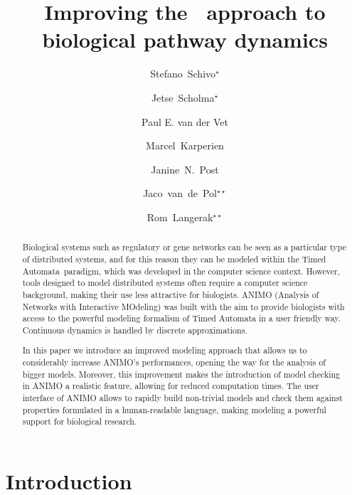 \documentclass{llncs}
\title{Improving the \tas\ approach to biological pathway dynamics}
\author{Stefano~Schivo${}^\star$
\and Jetse~Scholma${}^\star$
\and Paul E. van der Vet
\and Marcel~Karperien
\and Janine~N.~Post
\and Jaco~van~de~Pol${}^{\star \star}$
\and Rom~Langerak${}^{\star \star}$}
\institute{University of Twente, Enschede, The Netherlands}
\date{}
\newcommand{\tas}{Timed Automata}
\begin{document}
\maketitle

\let\oldthefootnote\thefootnote
\renewcommand{\thefootnote}{\fnsymbol{footnote}}
\let\thefootnote\oldthefootnote



\begin{abstract}

Biological systems such as regulatory or gene networks can be
seen as a particular type of distributed systems, and for this reason
they can be modeled within the \tas\ paradigm, which was developed in the
computer science context. However, tools designed to model distributed
systems often require a computer science background, making their use
less attractive for biologists. ANIMO (Analysis of Networks with
Interactive MOdeling) was built with the aim to provide biologists
with access to the powerful modeling formalism of Timed Automata
in a user friendly way. Continuous dynamics is handled by discrete approximations.


In this paper we introduce an improved modeling approach that allows us
to considerably increase ANIMO's performances, opening the way for the
analysis of bigger models. Moreover, this improvement makes the introduction
of model checking in ANIMO a realistic feature, allowing for
reduced computation times. The user interface of ANIMO allows to rapidly
build non-trivial models and check them against properties formulated in
a human-readable language, making modeling a powerful
support for biological research.

\end{abstract}

\section{Introduction}\label{sec:introduction}
\end{document}
